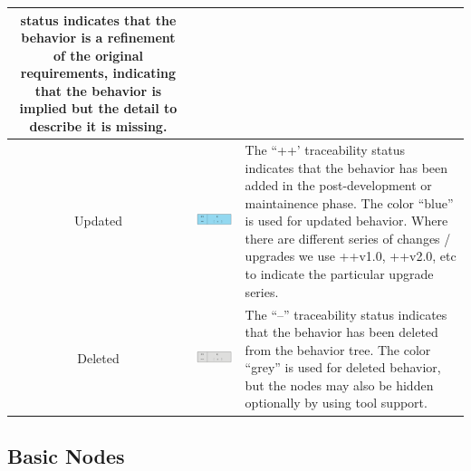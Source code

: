 \documentclass[]{article}
\begin{document}
\begin{tabularx}{\textwidth}{|c|c|X|}
status indicates that the behavior is a refinement of the original requirements, indicating that the behavior is implied but the detail to describe it is missing.\\ \hline
Updated &\includegraphics{figs/AppendixB/Tags/Refinement}  & The ``++' traceability status indicates that the behavior has been added in the post-development or maintainence phase. The color ``blue'' is used for updated behavior. Where there are different series of changes / upgrades we use ++v1.0, ++v2.0, etc to indicate the particular upgrade series.\\ \hline
Deleted & \includegraphics{figs/AppendixB/Tags/Deleted} & The ``--'' traceability status indicates that the behavior has been deleted from the behavior tree. The color ``grey'' is used for deleted behavior, but the nodes may also be hidden optionally by using tool support.
\end{tabularx}

\subsection{Basic Nodes}
\end{document}
